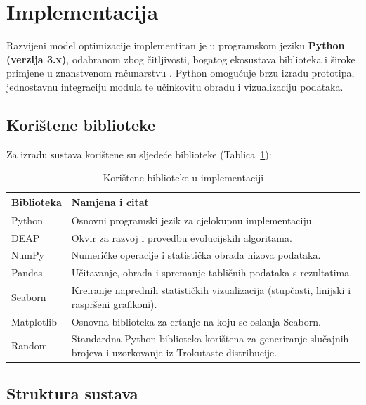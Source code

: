 
\section{Implementacija}

Razvijeni model optimizacije implementiran je u programskom jeziku \textbf{Python (verzija 3.x)}, odabranom zbog čitljivosti, bogatog ekosustava biblioteka i široke primjene u znanstvenom računarstvu \cite{PythonSoftwareFoundation}. Python omogućuje brzu izradu prototipa, jednostavnu integraciju modula te učinkovitu obradu i vizualizaciju podataka.

\subsection{Korištene biblioteke}

Za izradu sustava korištene su sljedeće biblioteke (Tablica~\ref{tab:biblioteke}):

\begin{table}[H]
\centering
\caption{Korištene biblioteke u implementaciji}
\label{tab:biblioteke}
\begin{tabular}{|l|p{10cm}|}
\hline
\textbf{Biblioteka} & \textbf{Namjena i citat} \\ \hline
Python & Osnovni programski jezik za cjelokupnu implementaciju. \cite{PythonSoftwareFoundation} \\ \hline
DEAP & Okvir za razvoj i provedbu evolucijskih algoritama. \cite{DEAP2012} \\ \hline
NumPy & Numeričke operacije i statistička obrada nizova podataka. \cite{Harris2020} \\ \hline
Pandas & Učitavanje, obrada i spremanje tabličnih podataka s rezultatima. \cite{PandasDevelopmentTeam2020} \\ \hline
Seaborn & Kreiranje naprednih statističkih vizualizacija (stupčasti, linijski i raspršeni grafikoni). \cite{Waskom2021} \\ \hline
Matplotlib & Osnovna biblioteka za crtanje na koju se oslanja Seaborn. \cite{Hunter2007} \\ \hline
Random & Standardna Python biblioteka korištena za generiranje slučajnih brojeva i uzorkovanje iz Trokutaste distribucije. \\ \hline
\end{tabular}
\end{table}
\subsection{Struktura sustava}


